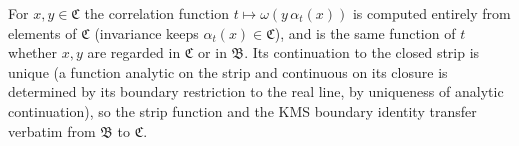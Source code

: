 For $x, y \in \mathfrak{C}$ the correlation function $t \mapsto \omega(y\,\alpha_t(x))$ is computed entirely from elements of $\mathfrak{C}$ (invariance keeps $\alpha_t(x) \in \mathfrak{C}$), and is the same function of $t$ whether $x, y$ are regarded in $\mathfrak{C}$ or in $\mathfrak{B}$. Its continuation to the closed strip is unique (a function analytic on the strip and continuous on its closure is determined by its boundary restriction to the real line, by uniqueness of analytic continuation), so the strip function and the KMS boundary identity transfer verbatim from $\mathfrak{B}$ to $\mathfrak{C}$.
